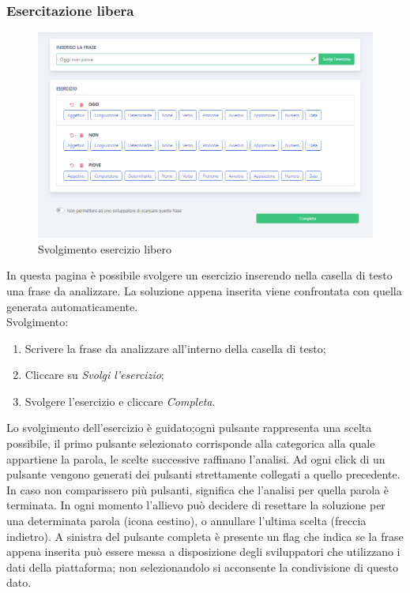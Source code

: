         \subsubsection{Esercitazione libera}      
        	\begin{figure}[H]
                \centering
                \includegraphics[width=17cm]{sez/img/studente/esercitazioneLiberaEsegui.PNG} 
                \caption{Svolgimento esercizio libero}\label{fig:1}
        	\end{figure}
          In questa pagina è possibile svolgere un esercizio inserendo nella casella di testo una frase da analizzare. La soluzione appena inserita viene confrontata con quella generata automaticamente.
        \\ Svolgimento:
        	\begin{enumerate}        
            	\item Scrivere la frase da analizzare all'interno della casella di testo;
            	\item Cliccare su \textit{Svolgi l'esercizio};
            	\item Svolgere l'esercizio e cliccare \textit{Completa}.
        	\end{enumerate}
        	\label{sec:esLib}
        	Lo svolgimento dell'esercizio è guidato;ogni pulsante rappresenta una scelta possibile, il primo pulsante selezionato corrisponde alla categorica alla quale appartiene la parola, le scelte successive raffinano l'analisi. Ad ogni click di un pulsante vengono generati dei pulsanti strettamente collegati a quello precedente. In caso non comparissero più pulsanti, significa che l'analisi per quella parola è terminata. In ogni momento l'allievo può decidere di resettare la soluzione per una determinata parola (icona cestino), o annullare l'ultima scelta (freccia indietro).        \linebreak	
        A sinistra del pulsante completa è presente un flag che indica se la frase appena inserita può essere messa a disposizione degli sviluppatori che utilizzano i dati della piattaforma; non selezionandolo si acconsente la condivisione di questo dato.
        	

